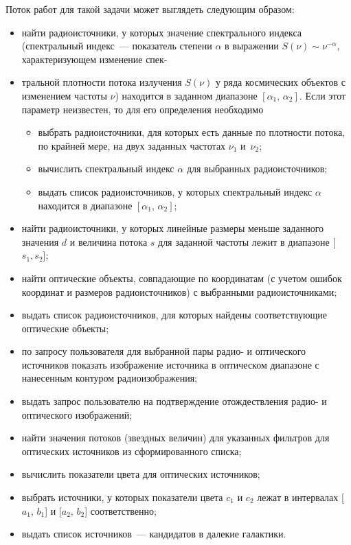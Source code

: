 \begin{multicols}{2}
Поток работ для такой задачи может выглядеть следующим образом:
\begin{itemize}
\item найти радиоисточники, у которых значение спектрального индекса
(спектральный индекс~--- показатель степени $\alpha$ в выражении
$S(\nu) \sim \nu^{-\alpha}$, характеризующем изменение спек-\linebreak
\vspace*{-12pt}
\pagebreak

\item[\ ]
тральной плотности потока
излучения $S(\nu)$ у ряда космических объектов с
изменением частоты $\nu$) находится в
заданном диапазоне $[\alpha_1,\,\alpha_2]$. Если этот параметр неизвестен,
то для его определения необходимо
\begin{itemize}
\item выбрать радиоисточники, для которых есть данные по плотности потока, по
крайней мере, на двух заданных частотах $\nu_1$ и~$\nu_2$;
\item вычислить спектральный индекс $\alpha$ для выбранных радиоисточников;
\item выдать список радиоисточников, у которых спектральный индекс $\alpha$
находится в диапазоне $[\alpha_1,\,\alpha_2]$;
\end{itemize}
\item найти радиоисточники, у которых линейные размеры меньше заданного
значения $d$ и величина потока $s$ для заданной частоты  лежит в диапазоне
[$s_1,s_2$];
\item найти оптические объекты, совпадающие по координатам (с учетом ошибок
координат и размеров радиоисточников) с выбранными радиоисточниками;
\item выдать список радиоисточников, для которых найдены соответствующие
оптические \mbox{объекты};
\item по запросу пользователя для выбранной пары радио- и оптического источников
показать изоб\-ра\-же\-ние источника в оптическом диапазоне с нанесенным
контуром радиоизображения;
\item выдать запрос пользователю на подтверждение отож\-де\-ст\-вле\-ния радио- и оптического
изображений;
\item найти значения потоков (звездных величин) для указанных фильтров для
оптических источников из сформированного списка;
\item вычислить показатели цвета для оптических источников;
\item выбрать источники, у которых показатели цвета $c_1$ и $c_2$ лежат в
интервалах [$a_1,\,b_1$] и [$a_2,\,b_2$] соответственно;
\item выдать список источников~--- кандидатов в далекие галактики.
\end{itemize}


\end{multicols}
